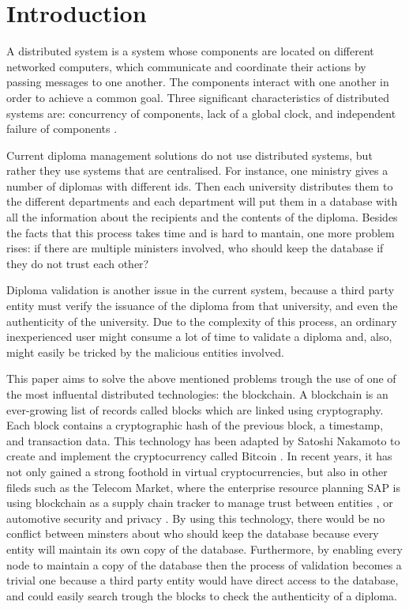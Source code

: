 \documentclass[conference]{IEEEtran}
\begin{document}
\section{Introduction}
    A distributed system is a system whose components are located on different networked computers, which communicate and coordinate their actions by passing messages to one another. The components interact with one another in order to achieve a common goal. Three significant characteristics of distributed systems are: concurrency of components, lack of a global clock, and independent failure of components \cite{tanenbaum2007distributed}. 

    Current diploma management solutions do not use distributed systems, but rather they use systems that are centralised. For instance, one ministry gives a number of diplomas with different ids. Then each university distributes them to the different departments and each department will put them in a database with all the information about the recipients and the contents of the diploma. Besides the facts that this process takes time and is hard to mantain, one more problem rises: if there are multiple ministers involved, who should keep the database if they do not trust each other? 
    
    Diploma validation is another issue in the current system, because a third party entity must verify the issuance of the diploma from that university, and even the authenticity of the university. Due to the complexity of this process, an ordinary inexperienced user might consume a lot of time to validate a diploma and, also, might easily be tricked by the malicious entities involved.
    
    This paper aims to solve the above mentioned problems trough the use of one of the most influental distributed technologies: the blockchain. A blockchain is an ever-growing list of records called blocks which are linked using cryptography. Each block contains a cryptographic hash of the previous block, a timestamp, and transaction data. This technology has been adapted by Satoshi Nakamoto to create and implement the cryptocurrency called Bitcoin \cite{nakamoto2008bitcoin}. In recent years, it has not only gained a strong foothold in virtual cryptocurrencies, but also in other fileds such as the Telecom Market, where the enterprise resource planning SAP is using blockchain as a supply chain tracker to manage trust between entities \cite{grather2018blockchain}, or automotive security and privacy \cite{dorri2017blockchain}. By using this technology, there would be no conflict between minsters about who should keep the database because every entity will maintain its own copy of the database. Furthermore, by enabling every node to maintain a copy of the database then the process of validation becomes a trivial one because a third party entity would have direct access to the database, and could easily search trough the blocks to check the authenticity of a diploma.
    
\end{document}

